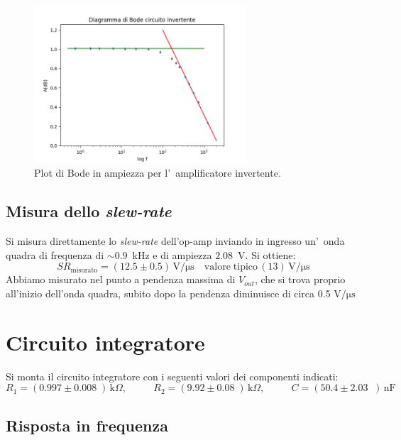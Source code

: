 \documentclass[10pt,a4paper]{article}
\newcommand{\exn}{\phantom{xxx}}
\begin{document}
	
	
	\begin{figure}[h]
		\begin{center}
			
			\includegraphics[width=0.7\textwidth]{bodeInvertente}
			\caption{\small Plot di Bode in ampiezza per l'~amplificatore invertente.}
			\label{fig:bodeinv}
		\end{center}
	\end{figure}
	\subsection{Misura dello \emph{slew-rate}}
	Si misura direttamente lo \emph{slew-rate} dell'op-amp inviando in ingresso un'~onda quadra 
	di frequenza di $\sim 0.9$~kHz e di ampiezza $2.08$~V. Si ottiene:
	\[
	SR_\mathrm{misurato} = (12.5 \pm 0.5 )\,\mathrm{V/\mu s} \quad \mathrm{valore \; tipico}\, (13 )\,\mathrm{V/\mu s}\
	\]
Abbiamo misurato nel  punto a pendenza massima di $V_{out}$, che si trova proprio all'inizio dell'onda quadra, subito dopo la pendenza diminuisce di circa 0.5 $ \mathrm{V/\mu s}$
	\section{Circuito integratore}
	Si monta il circuito integratore con i seguenti valori  dei componenti indicati: 
	\[
	R_1 = (0.997 \pm 0.008 \;) \,\mathrm{k}\Omega, \:\:\;\:\exn 
	R_2 = (9.92 \pm 0.08 \;) \,\mathrm{k}\Omega, \:\:\;\:\exn 
	C = (50.4 \pm 2.03 \;\;)\,\mathrm{nF}
	\]
	
	\subsection{Risposta in frequenza}
	
\end{document}
